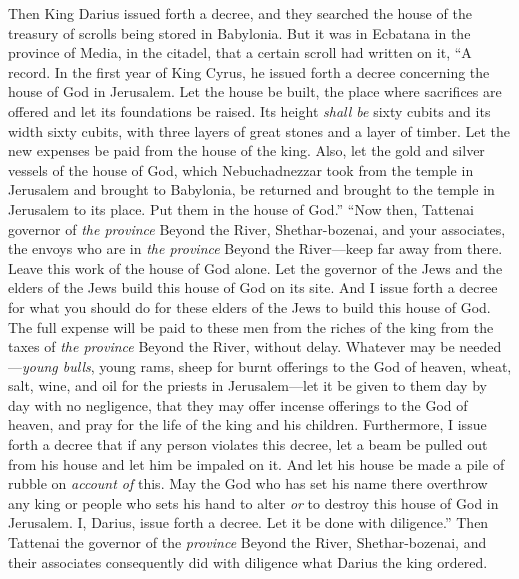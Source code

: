 \begin{biblechapter} %
 Then King Darius issued forth a decree, and they searched the house of the treasury of scrolls being stored in Babylonia.
\verse But it was in Ecbatana in the province of Media, in the citadel, that a certain scroll had written on it, “A record.
\verse In the first year of King Cyrus, he issued forth a decree concerning the house of God in Jerusalem. Let the house be built, the place where sacrifices are offered and let its foundations be raised. Its height \textit{shall be} sixty cubits and its width sixty cubits,
\verse with three layers of great stones and a layer of timber. Let the new expenses be paid from the house of the king.
\verse Also, let the gold and silver vessels of the house of God, which Nebuchadnezzar took from the temple in Jerusalem and brought to Babylonia, be returned and brought to the temple in Jerusalem to its place. Put them in the house of God.”
 “Now then, Tattenai governor of \textit{the province} Beyond the River, Shethar-bozenai, and your associates, the envoys who are in \textit{the province} Beyond the River—keep far away from there.
\verse Leave this work of the house of God alone. Let the governor of the Jews and the elders of the Jews build this house of God on its site.
\verse And I issue forth a decree for what you should do for these elders of the Jews to build this house of God. The full expense will be paid to these men from the riches of the king from the taxes of \textit{the province} Beyond the River, without delay.
\verse Whatever may be needed—\textit{young bulls}, young rams, sheep for burnt offerings to the God of heaven, wheat, salt, wine, and oil for the priests in Jerusalem—let it be given to them day by day with no negligence,
\verse that they may offer incense offerings to the God of heaven, and pray for the life of the king and his children.
\verse Furthermore, I issue forth a decree that if any person violates this decree, let a beam be pulled out from his house and let him be impaled on it. And let his house be made a pile of rubble on \textit{account of} this.
\verse May the God who has set his name there overthrow any king or people who sets his hand to alter \textit{or} to destroy this house of God in Jerusalem. I, Darius, issue forth a decree. Let it be done with diligence.”
 Then Tattenai the governor of the \textit{province} Beyond the River, Shethar-bozenai, and their associates consequently did with diligence what Darius the king ordered.

\end{biblechapter}
